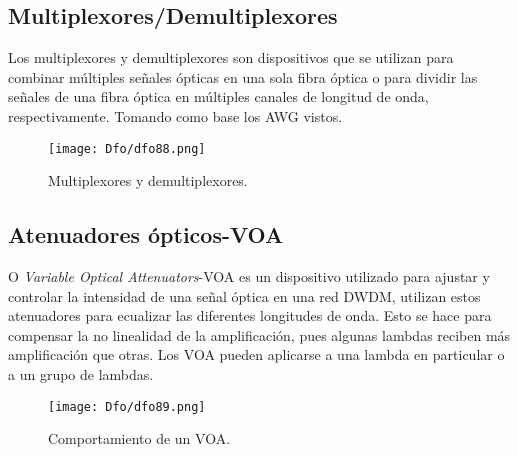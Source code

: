 \documentclass[
	12pt, %
	fleqn, %
	a4paper, %
	oneside, %
]{LegrandOrangeBook}
\begin{document}
\subsection{Multiplexores/Demultiplexores}
Los multiplexores y demultiplexores son dispositivos que se utilizan para combinar múltiples señales ópticas en una sola fibra óptica o para dividir las señales de una fibra óptica en múltiples canales de longitud de onda, respectivamente. Tomando como base los AWG vistos.
\begin{figure}[H]
\centering
\texttt{[image: Dfo/dfo88.png]}
\caption{Multiplexores y demultiplexores.}
\end{figure}
\subsection{Atenuadores ópticos-VOA}
O \textit{Variable Optical Attenuators}-VOA es un dispositivo utilizado para ajustar y controlar la intensidad de una señal óptica en una red DWDM, utilizan estos atenuadores para ecualizar las diferentes longitudes de onda. Esto se hace para compensar la no linealidad de la amplificación, pues algunas lambdas reciben más amplificación que otras. Los VOA pueden aplicarse a una lambda en particular o a un grupo de lambdas.
\begin{figure}[H]
\centering
\texttt{[image: Dfo/dfo89.png]}
\caption{Comportamiento de un VOA.}
\end{figure}
\end{document}
